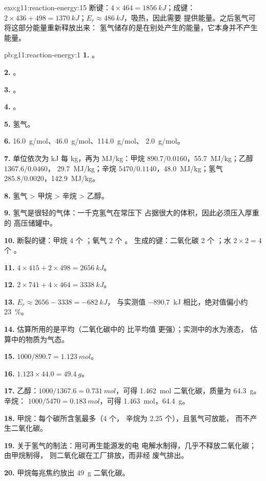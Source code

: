 \begin{solution}{exo:g11:reaction-energy:15}
断键：$4 \times 464 = \qty{1856}{kJ}$；成键：$2 \times 436 + 498 =
\qty{1370}{kJ}$；$E_r \approx \qty{+486}{kJ}$，吸热，因此需要
提供能量。之后氢气可将这部分能量重新释放出来：
氢气储存的是在别处产生的能量，它本身并不产生能量。
\end{solution}

\begin{solution}{pb:g11:reaction-energy:1}
\textbf{1.} 。

\textbf{2.} 。

\textbf{3.} 。

\textbf{4.} 。

\textbf{5.} 氢气。

\textbf{6.} \qty{16.0}{g/mol}、\qty{46.0}{g/mol}、\qty{114.0}{g/mol}、
\qty{2.0}{g/mol}。

\textbf{7.} 单位依次为 \si{kJ} 每 \si{kg}，再为 \si{MJ/kg}：甲烷
$890.7 / 0.0160$，\qty{55.7}{MJ/kg}；乙醇 $1367.6 / 0.0460$，
\qty{29.7}{MJ/kg}；辛烷 $5470 / 0.1140$，\qty{48.0}{MJ/kg}；氢气
$285.8 / 0.0020$，\qty{142.9}{MJ/kg}。

\textbf{8.} 氢气 > 甲烷 > 辛烷 > 乙醇。

\textbf{9.} 氢气是很轻的气体：一千克氢气在常压下
占据很大的体积，因此必须压入厚重的
高压储罐中。

\textbf{10.} 断裂的键：甲烷 4 个 ；氧气 2 个 。
生成的键：二氧化碳 2 个 ；水 $2 \times 2 = 4$ 个 。

\textbf{11.} $4 \times 415 + 2 \times 498 = \qty{2656}{kJ}$。

\textbf{12.} $2 \times 741 + 4 \times 464 = \qty{3338}{kJ}$。

\textbf{13.} $E_r \approx 2656 - 3338 = \qty{-682}{kJ}$，
与实测值 \qty{-890.7}{kJ} 相比，绝对值偏小约 \qty{23}{\percent}。

\textbf{14.} 估算所用的是平均（二氧化碳中的  比平均值
更强）；实测中的水为液态，
估算中的物质为气态。

\textbf{15.} $1000 / 890.7 = \qty{1.123}{mol}$。

\textbf{16.} $1.123 \times 44.0 = \qty{49.4}{g}$。

\textbf{17.} 乙醇：$1000 / 1367.6 = \qty{0.731}{mol}$，可得
\qty{1.462}{mol} 二氧化碳，质量为 \qty{64.3}{g}。辛烷：
$1000 / 5470 = \qty{0.183}{mol}$，可得 \qty{1.463}{mol}，\qty{64.4}{g}。

\textbf{18.} 甲烷：每个碳所含氢最多（4 个，
辛烷为 2.25 个），且氢气可放能，
而不产生二氧化碳。

\textbf{19.} 关于氢气的制法：用可再生能源发的电
电解水制得，几乎不释放二氧化碳；由甲烷制得，
则二氧化碳在工厂排放，而非经
废气排出。

\textbf{20.} 甲烷每兆焦约放出
\qty{49}{g} 二氧化碳。
\end{solution}
